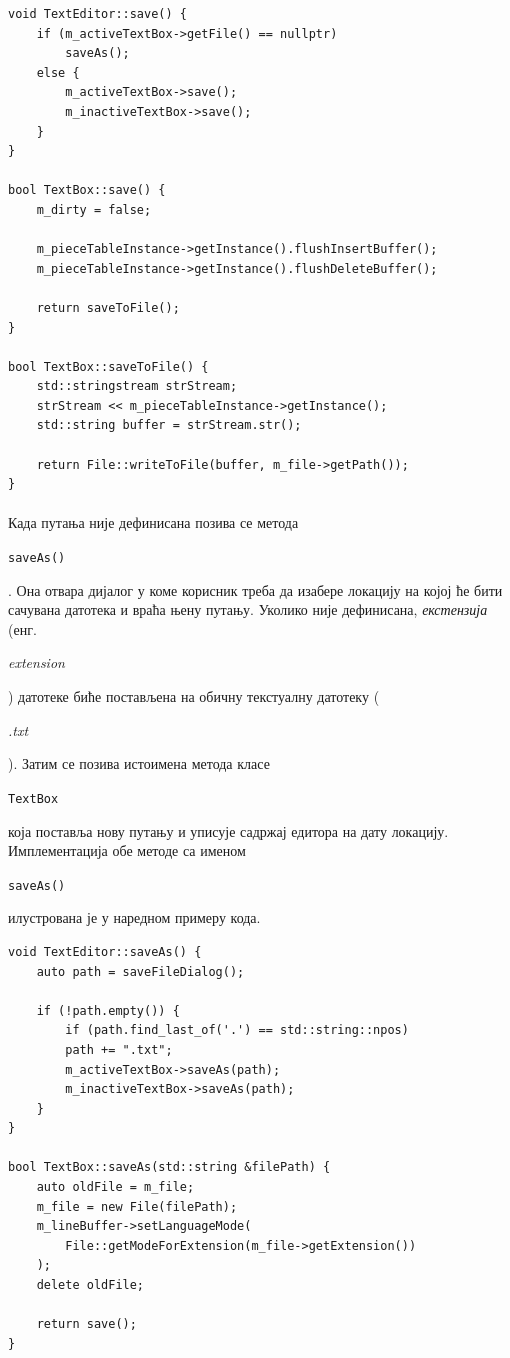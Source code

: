 \documentclass[12pt,oneside]{memoir}
\begin{document}
\begin{verbatim}
void TextEditor::save() {
	if (m_activeTextBox->getFile() == nullptr)
		saveAs();
	else {
		m_activeTextBox->save();
		m_inactiveTextBox->save();
	}
}

bool TextBox::save() {
	m_dirty = false;
	
	m_pieceTableInstance->getInstance().flushInsertBuffer();
	m_pieceTableInstance->getInstance().flushDeleteBuffer();
	
	return saveToFile();
}

bool TextBox::saveToFile() {
	std::stringstream strStream;
	strStream << m_pieceTableInstance->getInstance();
	std::string buffer = strStream.str();
	
	return File::writeToFile(buffer, m_file->getPath());
}
\end{verbatim}



\paragraph{}
Када путања није дефинисана позива се метода \begin{latinica}\verb|saveAs()|\end{latinica}.
Она отвара дијалог у коме корисник треба да изабере локацију на којој ће бити сачувана
датотека и враћа њену путању. Уколико није дефинисана, \emph{екстензија}
(енг. \begin{latinica}\textit{extension}\end{latinica}) датотеке биће
постављена на обичну текстуалну датотеку (\begin{latinica}\textit{.txt}\end{latinica}).
Затим се позива истоимена метода класе \begin{latinica}\verb|TextBox|\end{latinica} која
поставља нову путању и уписује садржај едитора на дату локацију. Имплементација обе
методе са именом \begin{latinica}\verb|saveAs()|\end{latinica} илустрована је у 
наредном примеру кода.

\begin{verbatim}
void TextEditor::saveAs() {
	auto path = saveFileDialog();
	
	if (!path.empty()) {
		if (path.find_last_of('.') == std::string::npos)
		path += ".txt";
		m_activeTextBox->saveAs(path);
		m_inactiveTextBox->saveAs(path);
	}
}

bool TextBox::saveAs(std::string &filePath) {
	auto oldFile = m_file;
	m_file = new File(filePath);
	m_lineBuffer->setLanguageMode(
		File::getModeForExtension(m_file->getExtension())
	);
	delete oldFile;
	
	return save();
}
\end{verbatim}
\end{document}

